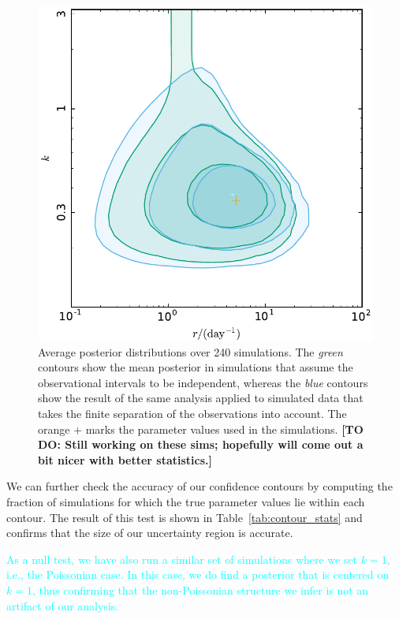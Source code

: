 \documentclass[fleqn,usenatbib]{mnras}
\newcommand{\new}[1]{\textcolor{cyan}{#1}}
\begin{document}
\begin{figure}
	\includegraphics[width=1.0\columnwidth]{finiteness.pdf}
	\caption{\label{fig:finiteness}Average posterior distributions over 240 simulations. The \emph{green} contours show the mean posterior in simulations that assume the observational intervals to be independent, whereas the \emph{blue} contours show the result of the same analysis applied to simulated data that takes the finite separation of the observations into account. The orange + marks the parameter values used in the simulations. \textbf{[TO DO: Still working on these sims; hopefully will come out a bit nicer with better statistics.]}}
\end{figure}

We can further check the accuracy of our confidence contours by computing the fraction of simulations for which the true parameter values lie within each contour. The result of this test is shown in Table~\ref{tab:contour_stats} and confirms that the size of our uncertainty region is accurate.

\new{As a null test, we have also run a similar set of simulations where we set $k=1$, i.e., the Poissonian case. In this case, we do find a posterior that is centered on $k=1$, thus confirming that the non-Poissonian structure we infer is not an artifact of our analysis.}
\end{document}
